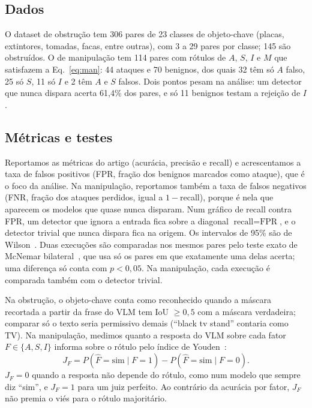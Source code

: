 \documentclass[conference]{IEEEtran}
\begin{document}
\subsection{Dados}
O dataset de obstrução tem 306 pares de 23 classes de objeto-chave (placas, extintores, tomadas, facas,
entre outras), com 3 a 29 pares por classe; 145 são obstruídos. O de manipulação tem 114 pares com
rótulos de $A$, $S$, $I$ e $M$ que satisfazem a Eq.~\eqref{eq:man}: 44 ataques e 70 benignos, dos quais
32 têm só $A$ falso, 25 só $S$, 11 só $I$ e 2 têm $A$ e $S$ falsos. Dois pontos pesam na análise: um
detector que nunca dispara acerta 61,4\% dos pares, e só 11 benignos testam a rejeição de $I$.

\subsection{Métricas e testes}
Reportamos as métricas do artigo (acurácia, precisão e recall) e acrescentamos a taxa de falsos
positivos (FPR, fração dos benignos marcados como ataque), que é o foco da análise. Na manipulação,
reportamos também a taxa de falsos negativos (FNR, fração dos ataques perdidos, igual a $1-$recall),
porque é nela que aparecem os modelos que quase nunca disparam. Num gráfico de recall contra FPR, um
detector que ignora a entrada fica sobre a diagonal $\text{recall}=\text{FPR}$, e o detector trivial
que nunca dispara fica na origem. Os intervalos de 95\% são de Wilson~\cite{wilson}. Duas execuções são
comparadas nos mesmos pares pelo teste exato de McNemar bilateral~\cite{mcnemar1947,dietterich1998}, que
usa só os pares em que exatamente uma delas acerta; uma diferença só conta com $p<0{,}05$. Na
manipulação, cada execução é comparada também com o detector trivial.

Na obstrução, o objeto-chave conta como reconhecido quando a máscara recortada a partir da frase do VLM
tem IoU $\geq 0{,}5$ com a máscara verdadeira; comparar só o texto seria permissivo demais (``black tv
stand'' contaria como TV). Na manipulação, medimos quanto a resposta do VLM sobre cada fator
$F\in\{A,S,I\}$ informa sobre o rótulo pelo índice de Youden~\cite{youden1950}:
\begin{equation}
J_F = P(\hat F=\text{sim}\mid F=1) - P(\hat F=\text{sim}\mid F=0).
\label{eq:youden}
\end{equation}
$J_F=0$ quando a resposta não depende do rótulo, como num modelo que sempre diz ``sim'', e $J_F=1$ para um
juiz perfeito. Ao contrário da acurácia por fator, $J_F$ não premia o viés para o rótulo majoritário.
\end{document}
